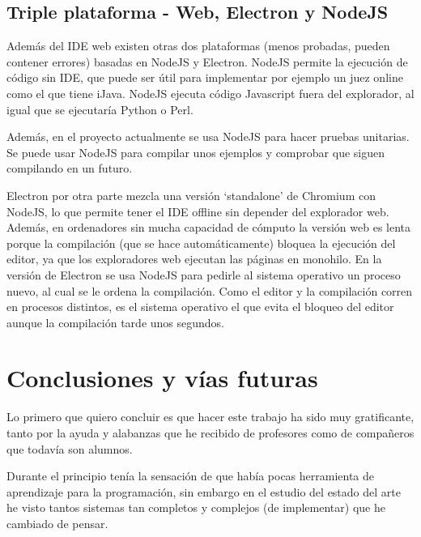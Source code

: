 \documentclass{report}
\begin{document}
	
	\section{Triple plataforma - Web, Electron y NodeJS}
	
	Además del IDE web existen otras dos plataformas (menos probadas, pueden contener errores) basadas en NodeJS y Electron. NodeJS permite la ejecución de código sin IDE, que puede ser útil para implementar por ejemplo un juez online como el que tiene iJava. NodeJS ejecuta código Javascript fuera del explorador, al igual que se ejecutaría Python o Perl. 
	
	\vspace{10px}
	
	Además, en el proyecto actualmente se usa NodeJS para hacer pruebas unitarias. Se puede usar NodeJS para compilar unos ejemplos y comprobar que siguen compilando en un futuro. 
	
	\vspace{10px}
	
	Electron por otra parte mezcla una versión `standalone' de Chromium con NodeJS, lo que permite tener el IDE offline sin depender del explorador web. Además, en ordenadores sin mucha capacidad de cómputo la versión web es lenta porque la compilación (que se hace automáticamente) bloquea la ejecución del editor, ya que los exploradores web ejecutan las páginas en monohilo. En la versión de Electron se usa NodeJS para pedirle al sistema operativo un proceso nuevo, al cual se le ordena la compilación. Como el editor y la compilación corren en procesos distintos, es el sistema operativo el que evita el bloqueo del editor aunque la compilación tarde unos segundos.  
	
	\chapter{Conclusiones y vías futuras}
	
	Lo primero que quiero concluir es que hacer este trabajo ha sido muy gratificante, tanto por la ayuda y alabanzas que he recibido de profesores como de compañeros que todavía son alumnos.
	
	\vspace{10px}
	
	Durante el principio tenía la sensación de que había pocas herramienta de aprendizaje para la programación, sin embargo en el estudio del estado del arte he visto tantos sistemas tan completos y complejos (de implementar) que he cambiado de pensar. 
	
\end{document}
